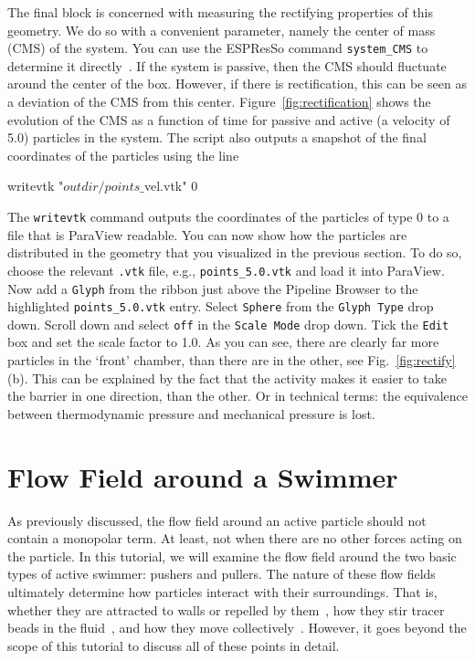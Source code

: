 \documentclass[aip,jcp,reprint,a4paper,onecolumn,amsmath]{revtex4-1}
\newcommand\code{\lstinline}
\newcommand{\es}{\mbox{\textsf{ESPResSo}}\xspace}
\newcommand\codees{\lstinline[language=espresso]}
\begin{document}
The final block is concerned with measuring the rectifying properties of this geometry. We do so with a convenient parameter, namely the center of mass (CMS) of the system. You can use the \es{} command \codees{system_CMS} to determine it directly~\cite{UG}. If the system is passive, then the CMS should fluctuate around the center of the box. However, if there is rectification, this can be seen as a deviation of the CMS from this center. Figure~\ref{fig:rectification} shows the evolution of the CMS as a function of time for passive and active (a velocity of 5.0) particles in the system. The script also outputs a snapshot of the final coordinates of the particles using the line
\begin{espresso}
writevtk "$outdir/points\_$vel.vtk" 0
\end{espresso}
The \codees{writevtk} command outputs the coordinates of the particles of type 0 to a file that is ParaView readable. You can now show how the particles are distributed in the geometry that you visualized in the previous section. To do so, choose the relevant \code{.vtk} file, e.g., \code{points_5.0.vtk} and load it into ParaView. Now add a \code{Glyph} from the ribbon just above the Pipeline Browser to the highlighted \code{points_5.0.vtk} entry. Select \code{Sphere} from the \code{Glyph Type} drop down. Scroll down and select \code{off} in the \code{Scale Mode} drop down. Tick the \code{Edit} box and set the scale factor to 1.0. As you can see, there are clearly far more particles in the `front' chamber, than there are in the other, see Fig.~\ref{fig:rectify}(b). This can be explained by the fact that the activity makes it easier to take the barrier in one direction, than the other. Or in technical terms: the equivalence between thermodynamic pressure and mechanical pressure is lost.

\section{\label{sec:flow}Flow Field around a Swimmer}

As previously discussed, the flow field around an active particle should not contain a monopolar term. At least, not when there are no other forces acting on the particle. In this tutorial, we will examine the flow field around the two basic types of active swimmer: pushers and pullers. The nature of these flow fields ultimately determine how particles interact with their surroundings. That is, whether they are attracted to walls or repelled by them~\cite{Spagnolie_12}, how they stir tracer beads in the fluid~\cite{Morozov_14}, and how they move collectively~\cite{Zoettl_14}. However, it goes beyond the scope of this tutorial to discuss all of these points in detail. 
\end{document}
